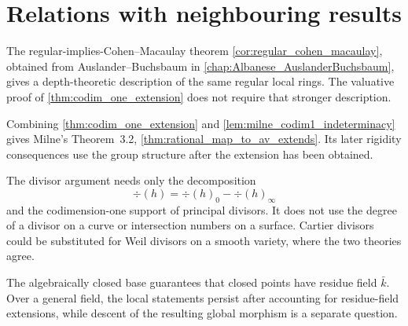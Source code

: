 \section{Relations with neighbouring results}
\label{sec:codim1_out_of_scope}

The regular-implies-Cohen--Macaulay theorem
\cref{cor:regular_cohen_macaulay}, obtained from Auslander--Buchsbaum in
\cref{chap:Albanese_AuslanderBuchsbaum}, gives a depth-theoretic description
of the same regular local rings.  The valuative proof of
\cref{thm:codim_one_extension} does not require that stronger description.

Combining \cref{thm:codim_one_extension} and
\cref{lem:milne_codim1_indeterminacy} gives Milne's Theorem~3.2,
\cref{thm:rational_map_to_av_extends}.  Its later rigidity consequences
use the group structure after the extension has been obtained.

The divisor argument needs only the decomposition
\[
  \div(h)=\div(h)_0-\div(h)_\infty
\]
and the codimension-one support of principal divisors.  It does not use the degree of a divisor on a curve or
intersection numbers on a surface.  Cartier divisors could be substituted
for Weil divisors on a smooth variety, where the two theories agree.

The algebraically closed base guarantees that closed points have residue
field \(\bar k\).  Over a general field, the local statements persist after
accounting for residue-field extensions, while descent of the resulting
global morphism is a separate question.
